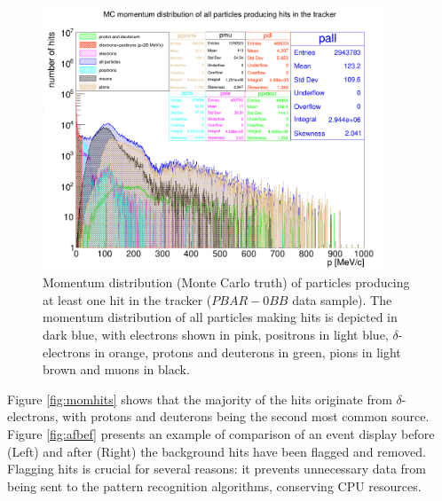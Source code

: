 \begin{figure}[!h]
    \centering
    \includegraphics[width =0.9\textwidth]{figures/png/Screenshot_20240815_124710.png}
\caption[Monte Carlo momentum distribution 
of particles producing hits in the Mu2e 
tracker ($PBAR-0BB$ data sample).]{
    Momentum distribution (Monte Carlo truth) 
    of particles producing at 
   least one hit in the tracker 
   ($PBAR-0BB$ data sample). 
   The momentum distribution 
   of all particles making hits is 
   depicted in dark blue, with electrons 
   shown in pink, positrons in light 
   blue, $\delta$-electrons in orange, protons 
   and deuterons in green, pions in 
   light brown and muons 
   in black. }
   \label{fig:pbar}
 \end{figure}


Figure \ref{fig:momhits} shows that 
the majority of the hits originate from $\delta$-electrons, 
with protons and deuterons being the second most 
common source. Figure \ref{fig:afbef} 
presents an example of comparison of an 
event display before (Left) and after (Right) the background 
hits have been flagged and removed.  
Flagging  hits is crucial for 
several reasons: it prevents unnecessary 
data from being sent to the pattern 
recognition algorithms, 
conserving  CPU resources.

